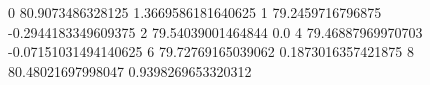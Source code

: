 0 80.9073486328125 1.3669586181640625
1 79.2459716796875 -0.2944183349609375
2 79.54039001464844 0.0
4 79.46887969970703 -0.07151031494140625
6 79.72769165039062 0.1873016357421875
8 80.48021697998047 0.9398269653320312
